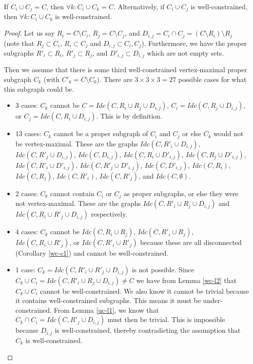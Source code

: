 \begin{lemma}\label{wc-l3}
If $C_i\cup C_j=C$, then $\forall k: C_i\cup C_k=C$.
Alternatively, if $C_i\cup C_j$ is well-constrained, then $\forall k: C_i\cup C_k$ is well-constrained.
\end{lemma}

\begin{proof}
Let us say $R_i=C\setminus C_i$, $R_j=C\setminus C_j$, and $D_{i,j}=C_i\cap C_j=(C\setminus R_i)\setminus R_j$ (note that $R_j\subset C_i$, $R_i\subset C_j$ and $D_{i,j}\subset C_i,C_j$). Furthermore, we have the proper subgraphs $R'_i\subset R_i$, $R'_j\subset R_j$, and $D'_{i,j}\subset D_{i,j}$ which are not empty sets.

Then we assume that there is some third well-constrained vertex-maximal proper subgraph $C_k$ (with $C'_k=C\setminus C_k$). There are $3\times 3\times 3 = 27$ possible cases for what this subgraph could be.

\begin{itemize}
    \item 3 cases: $C_k$ cannot be $C=Idc(C,R_i\cup R_j\cup D_{i,j})$, $C_i=Idc(C,R_j\cup D_{i,j})$, or $C_j=Idc(C,R_i\cup D_{i,j})$. This is by definition.

    \item 13 cases: $C_k$ cannot be a proper subgraph of $C_i$ and $C_j$ or else $C_k$ would not be vertex-maximal. These are the graphs $Idc(C,R'_i\cup D_{i,j})$, $Idc(C,R'_j\cup D_{i,j})$, $Idc(C, D_{i,j})$, $Idc(C,R_i\cup D'_{i,j})$, $Idc(C,R_j\cup D'_{i,j})$, $Idc(C,R'_i\cup D'_{i,j})$, $Idc(C,R'_j\cup D'_{i,j})$, $Idc(C, D'_{i,j})$, $Idc(C,R_i)$, $Idc(C,R_j)$, $Idc(C,R'_i)$, $Idc(C,R'_j)$, and $Idc(C,\emptyset)$.

    \item 2 cases: $C_k$ cannot contain $C_i$ or $C_j$ as proper subgraphs, or else they were not vertex-maximal. These are the graphs $Idc(C,R'_i\cup R_j\cup D_{i,j})$ and $Idc(C,R_i\cup R'_j\cup D_{i,j})$ respectively.

    \item 4 cases:  $C_k$ cannot be $Idc(C,R_i\cup R_j)$, $Idc(C,R'_i\cup R_j)$, $Idc(C,R_i\cup R'_j)$, or $Idc(C,R'_i\cup R'_j)$ because these are all disconnected (Corollary \ref{wc-c1}) and cannot be well-constrained.

    \item 1 case: $C_k=Idc(C,R'_i\cup R'_j\cup D_{i,j})$ is not possible. Since $C_k\cup C_i = Idc(C,R'_i\cup R_j\cup D_{i,j})\neq C$ we have from Lemma \ref{wc-l2} that $C_k\cup C_i$ cannot be well-constrained. We also know it cannot be trivial because it contains well-constrained subgraphs. This means it must be under-constrained. From Lemma \ref{uc-l1}, we know that $C_k\cap C_i=Idc(C,R'_j\cup D_{i,j})$ must then be trivial. This is impossible because $D_{i,j}$ is well-constrained, thereby contradicting the assumption that $C_k$ is well-constrained.


\end{itemize}
\end{proof}

